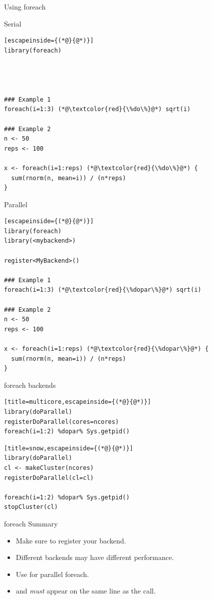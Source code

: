 \begin{frame}[fragile]{Using foreach}
  \begin{minipage}{0.47\textwidth}
     Serial
      \begin{lstlisting}[escapeinside={(*@}{@*)}]
library(foreach)




### Example 1
foreach(i=1:3) (*@\textcolor{red}{\%do\%}@*) sqrt(i)

### Example 2
n <- 50
reps <- 100

x <- foreach(i=1:reps) (*@\textcolor{red}{\%do\%}@*) {
  sum(rnorm(n, mean=i)) / (n*reps)
}
      \end{lstlisting}
  \end{minipage}
  \hspace{-1ex}
  \begin{minipage}{0.52\textwidth}
    Parallel
      \begin{lstlisting}[escapeinside={(*@}{@*)}]
library(foreach)
library(<mybackend>)

register<MyBackend>()

### Example 1
foreach(i=1:3) (*@\textcolor{red}{\%dopar\%}@*) sqrt(i)

### Example 2
n <- 50
reps <- 100

x <- foreach(i=1:reps) (*@\textcolor{red}{\%dopar\%}@*) {
  sum(rnorm(n, mean=i)) / (n*reps)
}
      \end{lstlisting}
  \end{minipage}
\end{frame}


\begin{frame}[fragile]{foreach backends}
\begin{lstlisting}[title=multicore,escapeinside={(*@}{@*)}]
library(doParallel)
registerDoParallel(cores=ncores)
foreach(i=1:2) %dopar% Sys.getpid()
\end{lstlisting}

\begin{lstlisting}[title=snow,escapeinside={(*@}{@*)}]
library(doParallel)
cl <- makeCluster(ncores)
registerDoParallel(cl=cl)

foreach(i=1:2) %dopar% Sys.getpid()
stopCluster(cl)
\end{lstlisting}
\end{frame}


\begin{frame}
  \begin{block}{foreach Summary}
    \begin{itemize}
      \item Make sure to register your backend.
      \item Different backends may have different performance.
      \item Use  for parallel foreach.
      \item {} and  \emph{must} appear on the same
line as the  call.
    \end{itemize}
  \end{block}
\end{frame}

